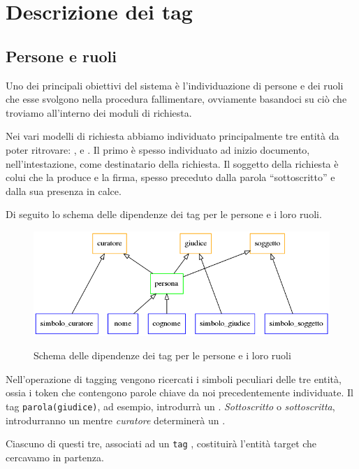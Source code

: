 
\section{Descrizione dei tag}

\subsection{Persone e ruoli}
Uno dei principali obiettivi del sistema è l'individuazione di persone e dei ruoli che esse svolgono nella procedura fallimentare, ovviamente basandoci su ciò che troviamo all'interno dei moduli di richiesta.

Nei vari modelli di richiesta abbiamo individuato principalmente tre entità da poter ritrovare: ,  e .
Il primo è spesso individuato ad inizio documento, nell'intestazione, come destinatario della richiesta.
Il soggetto della richiesta è colui che la produce e la firma, spesso preceduto dalla parola ``sottoscritto'' e dalla sua presenza in calce.

Di seguito lo schema delle dipendenze dei tag per le persone e i loro ruoli.

\begin{figure}[H]
\centering
\includegraphics[width=.7\textwidth]{img/persona.png}
\label{fig:persona}
\caption[Dipendenze tra i tag - Persone]{Schema delle dipendenze dei tag per le persone e i loro ruoli}
\end{figure}

Nell'operazione di tagging vengono ricercati i simboli peculiari delle tre entità, ossia i token che contengono parole chiave da noi precedentemente individuate.
Il tag \verb|parola(giudice)|, ad esempio, introdurrà un . \emph{Sottoscritto} o \emph{sottoscritta}, introdurranno un  mentre \emph{curatore} determinerà un .

Ciascuno di questi tre, associati ad un \verb|tag| , costituirà l'entità target che cercavamo in partenza.

